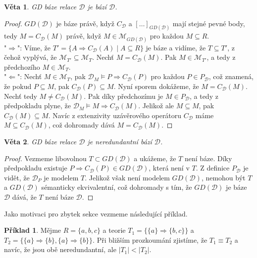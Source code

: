 \documentclass{article}
\newtheorem{theorem}{Věta}
\theoremstyle {definition}
\newtheorem{example}{Příklad}
\begin{document}
\begin{theorem}
  GD báze relace $\mathcal D$ je bází $\mathcal D$.
\end{theorem}
\begin{proof}
  $GD(\mathcal D)$ je báze právě, když $C_{\mathcal{D}}$ a
  $[\dots]_{GD(\mathcal D)}$ mají stejné pevné body, tedy $M =
  C_{\mathcal{D}}(M)$ právě, když $M \in \mathcal{M}_{GD(\mathcal D)}$
  pro každou $M\subseteq R$.\\
  
  "$\Rightarrow$": Víme, že $T' = \{A \Rightarrow C_{\mathcal{D}}(A)
  \mid A \subseteq R\}$ je báze a vidíme, že $T \subseteq T'$, z čehož
  vyplývá, že $\mathcal{M}_{T'} \subseteq \mathcal{M}_T$. Nechť $M =
  C_{\mathcal{D}}(M)$. Pak $M \in \mathcal{M}_{T'}$, a tedy z
  předchozího $M \in \mathcal{M}_T$.\\
  
  "$\Leftarrow$": Nechť $M \in \mathcal{M}_T$, pak $\mathcal{D}_M
  \models P \Rightarrow C_{\mathcal{D}}(P)$ pro každou $P \in
  P_{\mathcal{D}}$, což znamená, že pokud $P \subseteq M$, pak
  $C_{\mathcal{D}}(P) \subseteq M$. Nyní sporem dokážeme, že $M =
  C_{\mathcal{D}}(M)$. Nechť tedy $M \neq C_{\mathcal{D}}(M)$. Pak
  díky předchozímu je $M \in P_{\mathcal{D}}$, a tedy z předpokladu
  plyne, že $\mathcal{D}_M \models M \Rightarrow
  C_{\mathcal{D}}(M)$. Jelikož ale $M \subseteq M$, pak
  $C_{\mathcal{D}}(M) \subseteq M$. Navíc z extenzivity uzávěrového
  operátoru $C_{\mathcal{D}}$ máme $M \subseteq C_{\mathcal{D}}(M)$,
  což dohromady dává $M = C_{\mathcal{D}}(M)$.
\end{proof}

\begin {theorem}
  GD báze relace $\mathcal D$ je neredundantní bází $\mathcal D$.
\end {theorem}
\begin {proof}
  Vezmeme libovolnou $T\subset GD(\mathcal D)$ a ukážeme, že $T$ není
  báze. Díky předpokladu existuje $P \Rightarrow C_{\mathcal{D}}(P)\in
  GD(\mathcal D)$, která není v $T$. Z definice $P_{\mathcal{D}}$ je
  vidět, že $\mathcal{D}_P$ je modelem $T$. Jelikož však není modelem
  $GD(\mathcal D)$, nemohou být $T$ a $GD(\mathcal D)$ sémanticky
  ekvivalentní, což dohromady s tím, že $GD(\mathcal D)$ je báze
  $\mathcal D$ dává, že $T$ není báze $\mathcal D$.
\end {proof}

Jako motivaci pro zbytek sekce vezmeme následující příklad.

\begin {example}
  Mějme $R=\{a,b,c\}$ a teorie $T_1=\{\{a\}\Rightarrow \{b,c\}\}$ a
  $T_2=\{\{a\}\Rightarrow \{b\}, \{a\}\Rightarrow \{b\}\}$. Při
  bližším prozkoumání zjistíme, že $T_1\equiv T_2$ a navíc, že jsou
  obě neredundantní, ale $|T_1| < |T_2|$.
\end {example}
\end{document}
